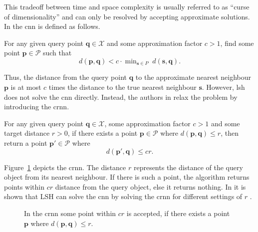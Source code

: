\documentclass[../../../main.tex]{subfiles}
\begin{document}
This tradeoff between time and space complexity is usually referred to as ``curse of dimensionality'' and can only be resolved by accepting approximate solutions. In \cite{indyk_approximate_1998} the \gls{cnn} is defined as follows.

\begin{definition}
    For any given query point $\bm{q} \in \mathcal{X}$ and some approximation factor $c > 1$, find some point $\bm{p} \in \mathcal{P}$ such that
    \begin{equation}
        d(\bm{p},\bm{q}) < c \cdot \mathop{\text{min}}_{\bm{s} \in P} \; d(\bm{s}, \bm{q}).
    \end{equation}
\end{definition}

Thus, the distance from the query point $\bm{q}$ to the approximate nearest neighbour $\bm{p}$ is at most $c$ times the distance to the true nearest neighbour $\bm{s}$. However, \gls{lsh} does not solve the \gls{cnn} directly. Instead, the authors in \cite{indyk_approximate_1998} relax the problem by introducing the \gls{crnn}.

\begin{definition}
    For any given query point $\bm{q} \in \mathcal{X}$, some approximation factor $c > 1$ and some target distance $r > 0$, if there exists a point $\bm{p} \in \mathcal{P}$ where $d(\bm{p},\bm{q}) \leq r$, then return a point $\bm{p}' \in \mathcal{P}$ where
    \begin{equation}
        d(\bm{p}',\bm{q}) \leq cr.
    \end{equation}
\end{definition}

Figure~\ref{fig:nearest_neighbour} depicts the \gls{crnn}. The distance $r$ represents the distance of the query object from its nearest neighbour. If there is such a point, the algorithm returns points within $cr$ distance from the query object, else it returns nothing. In \cite{indyk_approximate_1998} it is shown that LSH can solve the \gls{cnn} by solving the \gls{crnn} for different settings of $r$ .

\begin{figure}[t!]
    \centering
    
    \caption{In the \acrlong{crnn} some point within $cr$ is accepted, if there exists a point $\bm{p}$ where $d(\bm{p},\bm{q}) \leq r$.}
    \label{fig:nearest_neighbour}
\end{figure}
\end{document}
